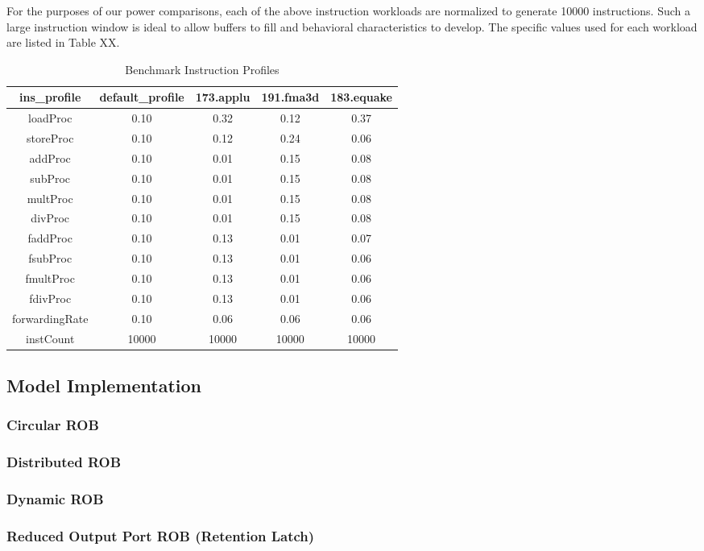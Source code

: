 \documentclass{acm_proc_article-sp}
\begin{document}
	For the purposes of our power comparisons, each of the above instruction workloads are normalized to generate 10000 instructions.  Such a large instruction window is ideal to allow buffers to fill and behavioral characteristics to develop.  The specific values used for each workload are listed in Table XX.
\begin{table*}
\centering
\begin{tabular}{|c|c|c|c|c|} \hline
ins\_profile&default\_profile&173.applu&191.fma3d&183.equake\\ \hline
loadProc&0.10&0.32&0.12&0.37\\ \hline
storeProc&0.10&0.12&0.24&0.06\\ \hline
addProc&0.10&0.01&0.15&0.08\\ \hline
subProc&0.10&0.01&0.15&0.08\\ \hline
multProc&0.10&0.01&0.15&0.08\\ \hline
divProc&0.10&0.01&0.15&0.08\\ \hline
faddProc&0.10&0.13&0.01&0.07\\ \hline
fsubProc&0.10&0.13&0.01&0.06\\ \hline
fmultProc&0.10&0.13&0.01&0.06\\ \hline
fdivProc&0.10&0.13&0.01&0.06\\ \hline
forwardingRate&0.10&0.06&0.06&0.06\\ \hline
instCount&10000&10000&10000&10000\\ \hline\end{tabular}
\caption{Benchmark Instruction Profiles}
\end{table*}
\subsection{Model Implementation}
\subsubsection{Circular ROB}
\subsubsection{Distributed ROB}
\subsubsection{Dynamic ROB}
\subsubsection{Reduced Output Port ROB (Retention Latch)}
\end{document}
